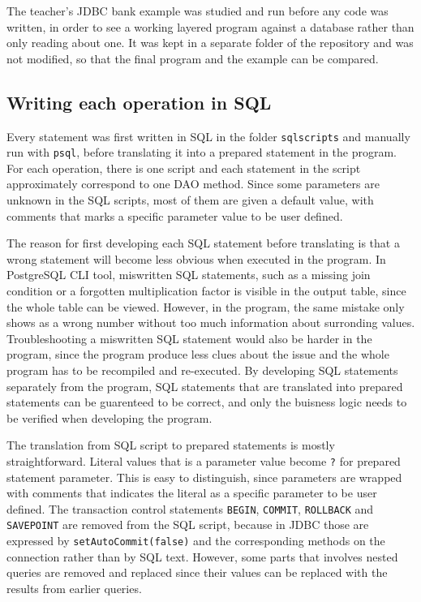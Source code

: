 \documentclass[a4paper]{scrartcl}
\renewcommand{\_}{\textunderscore\allowbreak}
\begin{document}
The teacher's JDBC bank example was studied and run before any code was written, in order to see a working layered program against a database rather than only reading about one. It was kept in a separate folder of the repository and was not modified, so that the final program and the example can be compared.

\subsection{Writing each operation in SQL}

Every statement was first written in SQL in the folder \texttt{sql\_scripts} and manually run with \texttt{psql}, before translating it into a prepared statement in the program. For each operation, there is one script and each statement in the script approximately correspond to one DAO method. Since some parameters are unknown in the SQL scripts, most of them are given a default value, with comments that marks a specific parameter value to be user defined.

The reason for first developing each SQL statement before translating is that a wrong statement will become less obvious when executed in the program. In PostgreSQL CLI tool, miswritten SQL statements, such as a missing join condition or a forgotten multiplication factor is visible in the output table, since the whole table can be viewed. However, in the program, the same mistake only shows as a wrong number without too much information about surronding values. Troubleshooting a miswritten SQL statement would also be harder in the program, since the program produce less clues about the issue and the whole program has to be recompiled and re-executed. By developing SQL statements separately from the program, SQL statements that are translated into prepared statements can be guarenteed to be correct, and only the buisness logic needs to be verified when developing the program.

The translation from SQL script to prepared statements is mostly straightforward. Literal values that is a parameter value become \texttt{?} for prepared statement parameter. This is easy to distinguish, since parameters are wrapped with comments that indicates the literal as a specific parameter to be user defined. The transaction control statements \texttt{BEGIN}, \texttt{COMMIT}, \texttt{ROLLBACK} and \texttt{SAVEPOINT} are removed from the SQL script, because in JDBC those are expressed by \texttt{setAutoCommit(false)} and the corresponding methods on the connection rather than by SQL text. However, some parts that involves nested queries are removed and replaced since their values can be replaced with the results from earlier queries.
\end{document}

